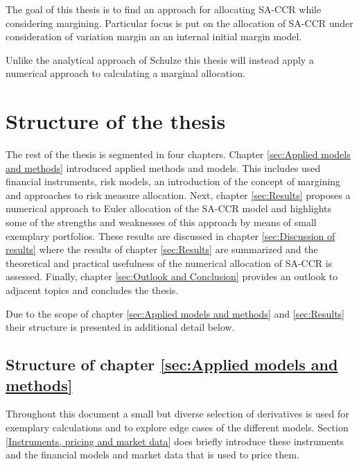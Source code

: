\documentclass[../Thesis_AHoecherl.tex]{subfiles}
\begin{document}
    The goal of this thesis is to find an approach for allocating SA-CCR while considering margining. Particular focus is put on the allocation of SA-CCR under consideration of variation margin an an internal initial margin model.

    Unlike the analytical approach of Schulze \cite{schulze2018capital} this thesis will instead apply a numerical approach to calculating a marginal allocation.
    


    \section{Structure of the thesis}

    The rest of the thesis is segmented in four chapters. Chapter \ref{sec:Applied models and methods} introduced applied methods and models.
    This includes used financial instruments, risk models, an introduction of the concept of margining and approaches to risk measure allocation.
    Next, chapter \ref{sec:Results} proposes a numerical approach to Euler allocation of the \gls{SA-CCR} model and highlights some of the strengths and weaknesses of this approach by means of small exemplary portfolios.
    These results are discussed in chapter \ref{sec:Discussion of results} where the results of chapter \ref{sec:Results} are summarized and the theoretical and practical usefulness of the numerical allocation of SA-CCR is assessed.
    Finally, chapter \ref{sec:Outlook and Conclusion} provides an outlook to adjacent topics and concludes the thesis.

    Due to the scope of chapter \ref{sec:Applied models and methods} and \ref{sec:Results} their structure is presented in additional detail below.

    \subsection{Structure of chapter \ref{sec:Applied models and methods}}

    Throughout this document a small but diverse selection of derivatives is used for exemplary calculations and to explore edge cases of the different models. Section \ref{Instruments, pricing and market data} does briefly introduce these instruments and the financial models and market data that is used to price them.
    
\end{document}
